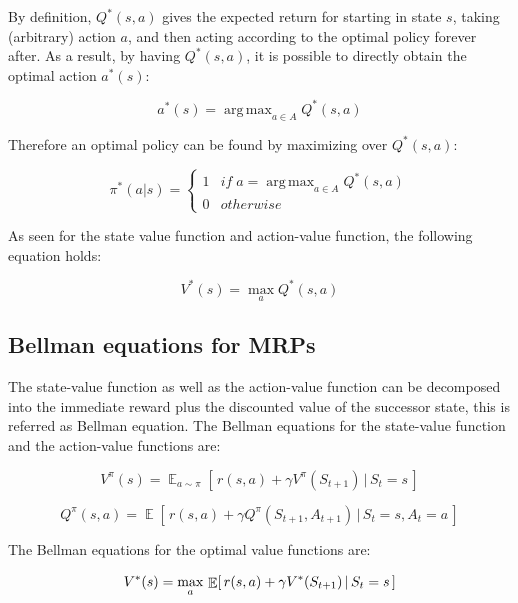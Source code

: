 \documentclass{article}
\DeclareMathOperator*{\E}{\mathbb{E}}
\DeclareMathOperator*{\argmax}{arg\,max}
\begin{document}
By definition, $Q^*(s,a)$ gives the expected return for starting in state $s$, taking (arbitrary) action $a$, and then acting according to the optimal policy forever after. As a result, by having $Q^*(s,a)$, it is possible to directly obtain the optimal action $a^*(s)$:

\begin{equation}
a^*(s) = \argmax_{a \in A} Q^* (s,a)
\end{equation}

Therefore an optimal policy can be found by maximizing over $Q^*(s,a)$:

\begin{equation}
	\pi^*(a|s) = 
	\begin{cases}
		1 & if \; a = \argmax_{a \in A} Q^*(s,a)\\
		0 & otherwise
	\end{cases}
	\label{eq:opt-policy}
\end{equation}

As seen for the state value function and action-value function, the following equation holds:

\begin{equation}
V^*(s) = \max_a Q^* (s,a)
\end{equation}

\subsection{Bellman equations for MRPs}
The state-value function as well as the action-value function can be decomposed into the immediate reward plus the discounted value of the successor state, this is referred as Bellman equation. The Bellman equations for the state-value function and the action-value functions are:


	\begin{equation}
	V^{\pi}(s) = \E_{a \sim \pi} [\, {r(s, a) + \gamma V^{\pi}(S_{t+1}) \,|\, S_t=s} \,]	
	\end{equation}

	\begin{equation}
		Q^{\pi}(s,a) = \E[\, {r(s,a) + \gamma {Q^{\pi}(S_{t+1},A_{t+1})} \,|\, S_t=s, A_t = a} \,]
	\end{equation}

The Bellman equations for the optimal value functions are:


\begin{equation}
	V^{*}(s) = \max_a \, \E [\, {r(s, a) + \gamma V^{*}(S_{t+1}) \,|\, S_t=s} \,] \\
\end{equation}
\end{document}
